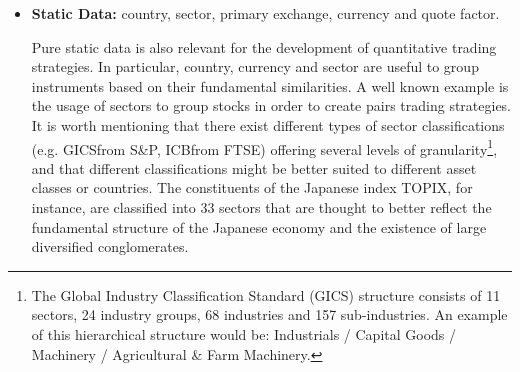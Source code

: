 \begin{itemize}
Mergers \& Acquisitions and Spin-offs are also regular events in the lifecycle of corporations. Their history needs to be recorded in order to account for the resulting changes in valuation that might affect a given ticker or tickers. These situations can also be exploited by trading strategies known as Merger Arbitrage.

Stocks quotation can be suspended as a cooling mechanism (often at the request of the underlying company) to prevent excess price volatility when significant information is about to be released to the market. Depending on the situation, the suspension can be temporary and intraday, or can last for extended periods of time if the market place allows it\footnote{For instance, it was the case for a large number of companies in China in 2016.}. Suspensions result in gaps in time series and are worth keeping track of as they can impact strategies backtesting (inability to to enter or exit a position, uncertainty in the pricing of composite assets if a given stock has a significant weight in ETFs or Indexes). 
Some markets will also suspend trading if the price swings more than a predefined amount (limit up / limit down situations) for either a period of time or for the remainder of the trading session.

\item \textbf{Static Data:} country, sector, primary exchange, currency and quote factor.

Pure static data is also relevant for the development of quantitative trading strategies. In particular, country, currency and sector are useful to group instruments based on their fundamental similarities. A well known example is the usage of sectors to group stocks in order to create pairs trading strategies. It is worth mentioning that there exist different types of sector classifications (e.g. GICS\textsuperscript\textregistered from S\&P, ICB\textsuperscript\textregistered from FTSE) offering several levels of granularity\footnote{The Global Industry Classification Standard (GICS) structure consists of 11 sectors, 24 industry groups, 68 industries and 157 sub-industries. An example of this hierarchical structure would be: Industrials / Capital Goods / Machinery / Agricultural \& Farm Machinery.}, and that different classifications might be better suited to different asset classes or countries. The constituents of the Japanese index TOPIX, for instance, are classified into 33 sectors that are thought to better reflect the fundamental structure of the Japanese economy and the existence of large diversified conglomerates. 


\end{itemize}
